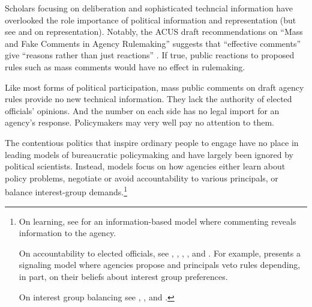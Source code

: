 Scholars focusing on deliberation and sophisticated techncial information have overlooked the role importance of political information and representation (but see \citet{Reich1966} and \citet{Seifter2016UCLA} on representation).
Notably, the ACUS draft recommendations on ``Mass and Fake Comments in Agency Rulemaking'' suggests that ``effective comments'' give ``reasons rather than just reactions'' \citep[p. 33]{ACUS2018}. If true, public reactions to proposed rules such as mass comments would have no effect in rulemaking. 

Like most forms of political participation, 
mass public comments on draft agency rules provide no new technical information. 
They lack the authority of elected officials' opinions. 
And the number on each side has no legal import for an agency's response.
Policymakers may very well pay no attention to them. 

The contentious politics that inspire ordinary people to engage have no place in leading models of bureaucratic policymaking and have largely been ignored by political scientists.
Instead, models focus on how agencies either learn about policy problems, negotiate or avoid accountability to various principals, or balance interest-group demands.\footnote{
On learning, see \citet{Libgober2018} for an information-based model where commenting reveals information to the agency. 

On accountability to elected officials, see  \citet{Furlong1997}, \citet{Nou2016}, \citet{Potter2016}, \citet{Woods2018}, and \citet{Yackee2009RegGov}. For example, \citet{Potter2014dis} presents a signaling model where agencies propose and principals veto rules depending, in part, on their beliefs about interest group preferences. 

On interest group balancing see \citet{Yackee2006JOP},  \citet{Yackee2006JPART}, and \citet{Kerwin2011}.
} 


